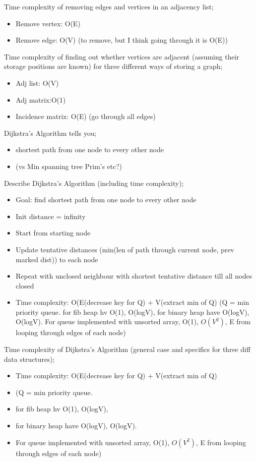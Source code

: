 \documentclass{article}
\begin{document}
Time complexity of removing edges and vertices in an adjacency list; \begin{itemize} \item Remove vertex: O(E) \item Remove edge: O(V) (to remove, but I think going through it is O(E))\end{itemize} 

Time complexity of finding out whether vertices are adjacent (assuming their storage positions are known) for three different ways of storing a graph; \begin{itemize} \item Adj list: O(V) \item Adj matrix:O(1) \item Incidence matrix: O(E) (go through all edges) \end{itemize} 

Dijkstra's Algorithm tells you; \begin{itemize} \item shortest path from one node to every other node \item (vs Min spanning tree Prim's etc?) \end{itemize}

Describe Dijkstra's Algorithm (including time complexity); \begin{itemize} \item Goal: find shortest path from one node to every other node \item Init distance = infinity \item Start from starting node \item Update tentative distances (min(len of path through current node, prev marked dist)) to each node \item Repeat with unclosed neighbour with shortest tentative distance till all nodes closed \item Time complexity: O(E(decrease key for Q) + V(extract min of Q) (Q = min priority queue. for fib heap hv  O(1), O(logV), for binary heap have O(logV), O(logV). For queue implemented with unsorted array, O(1), $O(V^2)$, E from looping through edges of each node) \end{itemize}

Time complexity of Dijkstra's Algorithm (general case and specifics for three diff data structures); \begin{itemize} \item Time complexity: O(E(decrease key for Q) + V(extract min of Q) \item (Q = min priority queue. \item for fib heap hv  O(1), O(logV), \item for binary heap have O(logV), O(logV). \item For queue implemented with unsorted array, O(1), $O(V^2)$, E from looping through edges of each node) \end{itemize}
\end{document}
